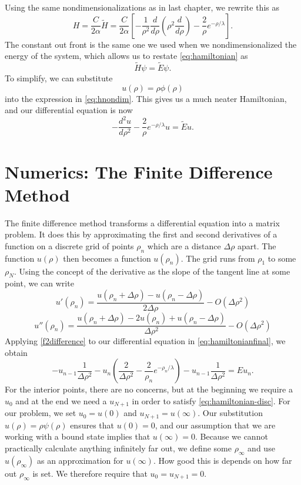 \documentclass[12pt,twoside]{reedthesis}
\newcommand{\eqn}[1]{\begin{equation}#1\end{equation}}
\begin{document}
Using the same nondimensionalizations as in last chapter, we rewrite this as 
\eqn{
H=\frac{C}{2\alpha}\tilde{H} = \frac{C}{2\alpha} \left[- \frac{1}{\rho^2}\frac{d}{d\rho}\left(\rho^2\frac{d}{d\rho}\right) - \frac{2}{\rho}e^{-\rho/\lambda}\right]\mbox{.}
\label{eq:hnondim}
}
The constant out front is the same one we used when we nondimensionalized the energy of the system, which allows us to restate \eqref{eq:hamiltonian} as
\eqn{
\tilde{H}\psi = \tilde{E}\psi\mbox{.}
}
To simplify, we can substitute 
\eqn{
u(\rho)=\rho \phi(\rho)}
into the expression in \eqref{eq:hnondim}\cite{griffiths_introduction_2005}. This gives us a much neater Hamiltonian, and our differential equation is now
\eqn{
-\frac{d^2 u }{d \rho^2} - \frac{2}{\rho}e^{-\rho/\lambda}u = \tilde{E} u\mbox{.}
\label{eq:hamiltonianfinal}
}

\section{Numerics: The Finite Difference Method}
The finite difference method transforms a differential equation into a matrix problem. It does this by approximating the first and second derivatives of a function on a discrete grid of points $\rho_n$ which are a distance $\Delta \rho$ apart. The function $u(\rho)$ then becomes a function $u(\rho_n)$. The grid runs from $\rho_1$ to some $\rho_N$. Using the concept of the derivative as the slope of the tangent line at some point, we can write
\eqn{
u'(\rho_n) = \frac{u(\rho_n + \Delta \rho) - u(\rho_n - \Delta \rho)}{2 \Delta \rho} - O(\Delta{\rho}^2)
\label{fdifference}
}
\eqn{
u''(\rho_n) = \frac{u(\rho_n + \Delta \rho) - 2 u(\rho_n) + u(\rho_n - \Delta \rho)}{\Delta \rho^2}-O(\Delta{\rho}^2) 
\label{f2difference}
}
Applying \eqref{f2difference} to our differential equation in \eqref{eq:hamiltonianfinal}, we obtain
\eqn{
-u_{n-1}\frac{1}{\Delta \rho^2} - u_n\left(\frac{2} {\Delta \rho^2} -  \frac{2}{\rho_n}e^{-\rho_n/\lambda} \right) - u_{n-1}\frac{1}{\Delta \rho^2}  = E u_n\mbox{.}
\label{eq:hamiltonian-disc}
}
For the interior points, there are no concerns, but at the beginning we require a $u_0$ and at the end we need a $u_{N+1}$ in order to satisfy \eqref{eq:hamiltonian-disc}. For our problem, we set $u_0 = u(0)$  and $u_{N+1} = u(\infty)$. Our substitution $u(\rho) = \rho \psi(\rho)$ ensures that $u(0) = 0$, and our assumption that we are working with a bound state implies that $u(\infty) = 0$. Because we cannot practically calculate anything infinitely far out, we define some $\rho_{\infty}$ and use $u(\rho_{\infty})$ as an approximation for $u(\infty)$. How good this is depends on how far out $\rho_{\infty}$ is set. We therefore require that $u_0 = u_{N+1} = 0$.
\end{document}
